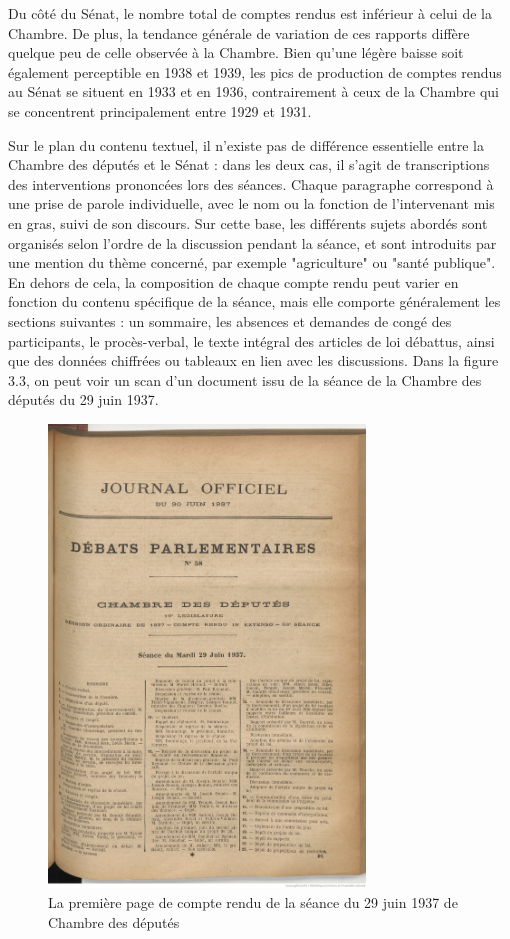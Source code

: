 \documentclass[a4paper,twoside,12pt]{book}
\begin{document}
Du côté du Sénat, le nombre total de comptes rendus est inférieur à celui de la Chambre. De plus, la tendance générale de variation de ces rapports diffère quelque peu de celle observée à la Chambre. Bien qu'une légère baisse soit également perceptible en 1938 et 1939, les pics de production de comptes rendus au Sénat se situent en 1933 et en 1936, contrairement à ceux de la Chambre qui se concentrent principalement entre 1929 et 1931.

Sur le plan du contenu textuel, il n'existe pas de différence essentielle entre la Chambre des députés et le Sénat : dans les deux cas, il s'agit de transcriptions des interventions prononcées lors des séances. Chaque paragraphe correspond à une prise de parole individuelle, avec le nom ou la fonction de l'intervenant mis en gras, suivi de son discours. Sur cette base, les différents sujets abordés sont organisés selon l'ordre de la discussion pendant la séance, et sont introduits par une mention du thème concerné, par exemple "agriculture" ou "santé publique". En dehors de cela, la composition de chaque compte rendu peut varier en fonction du contenu spécifique de la séance, mais elle comporte généralement les sections suivantes : un sommaire, les absences et demandes de congé des participants, le procès-verbal, le texte intégral des articles de loi débattus, ainsi que des données chiffrées ou tableaux en lien avec les discussions. Dans la figure 3.3, on peut voir un scan d'un document issu de la séance de la Chambre des députés du 29 juin 1937.

\begin{figure}
\centering %
\includegraphics[width=0.75\textwidth]{img/exp.jpeg}
\caption{La première page de compte rendu de la séance du 29 juin 1937 de Chambre des députés}
\end{figure}
\end{document}
